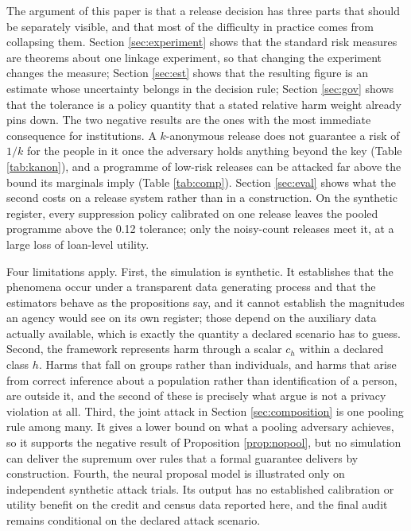 \documentclass[11pt,a4paper]{article}
\theoremstyle{plain}
\theoremstyle{definition}
\begin{document}
The argument of this paper is that a release decision has three parts that
should be separately visible, and that most of the difficulty in practice comes
from collapsing them. Section \ref{sec:experiment} shows that the standard risk
measures are theorems about one linkage experiment, so that changing the
experiment changes the measure; Section \ref{sec:est} shows that the resulting
figure is an estimate whose uncertainty belongs in the decision rule; Section
\ref{sec:gov} shows that the tolerance is a policy quantity that a stated relative harm weight
already pins down. The two negative results are the ones with the most
immediate consequence for institutions. A $k$-anonymous release does not guarantee a risk of $1/k$ for the people in
it once the adversary holds anything beyond the key (Table \ref{tab:kanon}), and a programme of low-risk releases can be
attacked far above the bound its marginals imply (Table \ref{tab:comp}). Section \ref{sec:eval} shows what
the second costs on a release system rather than in a construction. On the
synthetic register, every suppression policy calibrated on one release leaves the
pooled programme above the 0.12 tolerance; only the noisy-count releases meet it,
at a large loss of loan-level utility.

Four limitations apply. First, the simulation is synthetic.
It establishes that the phenomena occur under a transparent data generating
process and that the estimators behave as the propositions say, and it cannot
establish the magnitudes an agency would see on its own register; those depend
on the auxiliary data actually available, which is exactly the quantity a
declared scenario has to guess. Second, the framework represents harm through a
scalar $c_h$ within a declared class $h$. Harms that fall on groups rather than
individuals, and harms that arise from correct inference about a population
rather than identification of a person, are outside it, and the second of these
is precisely what \citet{dwork2014} argue is not a privacy violation at all.
Third, the joint attack in Section \ref{sec:composition} is one pooling rule
among many. It gives a lower bound on what a pooling adversary achieves, so it
supports the negative result of Proposition \ref{prop:nopool}, but no
simulation can deliver the supremum over rules that a formal guarantee delivers
by construction. Fourth, the neural proposal model is illustrated only on
independent synthetic attack trials. Its output has no established calibration
or utility benefit on the credit and census data reported here, and the final
audit remains conditional on the declared attack scenario.
\end{document}
